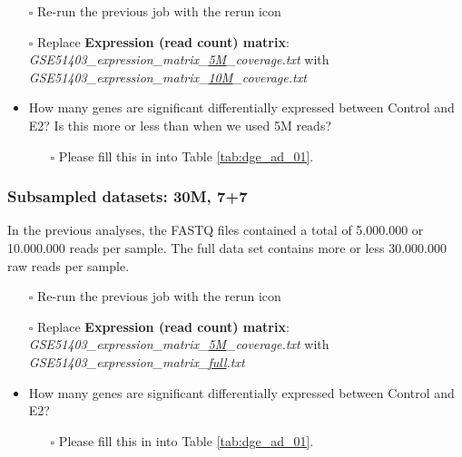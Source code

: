 \begin{itemize}
	\item [$\square$] Re-run the previous job with the rerun icon
	\item [$\square$] Replace \textbf{Expression (read count) matrix}: \textit{GSE51403\_expression\_matrix\_\underline{5M}\_coverage.txt} with \textit{GSE51403\_expression\_matrix\_\underline{10M}\_coverage.txt}
	\item How many genes are significant differentially expressed between Control and E2? Is this more or less than when we used 5M reads?
	\begin{itemize}
		\item[$\square$] Please fill this in into Table \ref{tab:dge_ad_01}.
	\end{itemize}
\end{itemize}
\subsubsection{Subsampled datasets: 30M, 7+7}
In the previous analyses, the FASTQ files contained a total of 5.000.000 or 10.000.000 reads per sample. The full data set contains more or less 30.000.000 raw reads per sample.
\begin{itemize}
	\item [$\square$] Re-run the previous job with the rerun icon
	\item [$\square$] Replace \textbf{Expression (read count) matrix}: \textit{GSE51403\_expression\_matrix\_\underline{5M}\_coverage.txt} with \textit{GSE51403\_expression\_matrix\_\underline{full}.txt}
	\item How many genes are significant differentially expressed between Control and E2?
	\begin{itemize}
		\item[$\square$] Please fill this in into Table \ref{tab:dge_ad_01}.
	\end{itemize}
\end{itemize}
